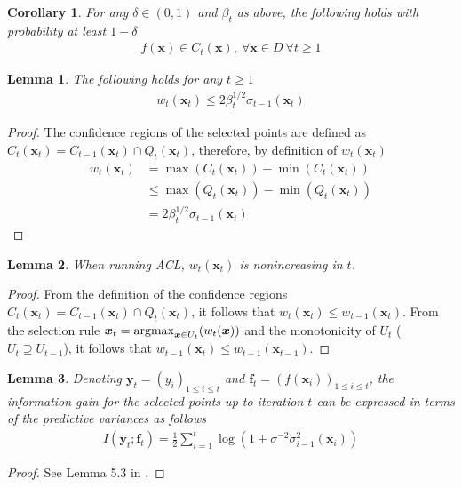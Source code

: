 \documentclass{article}
\def\*#1{\bm{#1}}
\newcommand{\argmax}{\operatornamewithlimits{argmax}}
\newtheorem{lemma}{Lemma}
\newtheorem{cor}{Corollary}
\newcommand{\acl}{\textsf{ACL}\xspace}
\begin{document}
\begin{cor}
\label{cor:cs}
For any $\delta \in (0, 1)$ and $\beta_t$ as above, the following holds
with probability at least $1-\delta$
\begin{align*}
f(\*x) \in C_t(\*x),\ \forall \*x \in D\ \forall t \geq 1
\end{align*}
\end{cor}

\begin{lemma}
\label{lem:wb}
The following holds for any $t \geq 1$
\begin{align*}
w_t(\*x_t) \leq 2\beta_t^{1/2}\sigma_{t-1}(\*x_t)
\end{align*}
\end{lemma}
\begin{proof}
The confidence regions of the selected points are defined as
$C_t(\*x_t) = C_{t-1}(\*x_t) \cap Q_t(\*x_t)$, therefore, by
definition of $w_t(\*x_t)$
\begin{align*}
w_t(\*x_t) &= \max(C_t(\*x_t)) - \min(C_t(\*x_t))\\
&\leq \max(Q_t(\*x_t)) - \min(Q_t(\*x_t))\\
&=2\beta_t^{1/2}\sigma_{t-1}(\*x_t)
\end{align*}
\end{proof}

\begin{lemma}
\label{lem:dec}
When running \acl, $w_t(\*x_t)$ is nonincreasing in $t$.
\end{lemma}
\begin{proof}
From the definition of the confidence regions
$C_t(\*x_t) = C_{t-1}(\*x_t) \cap Q_t(\*x_t)$, it follows that
$w_t(\*x_t) \leq w_{t-1}(\*x_t)$. From the selection rule
$\*x_t = \argmax_{\*x\in U_t}(w_t(\*x))$ and the monotonicity of
$U_t$ ($U_t \supseteq U_{t-1}$), it follows that
$w_{t-1}(\*x_t) \leq w_{t-1}(\*x_{t-1})$.
\end{proof}

\begin{lemma}
\label{lem:ig}
Denoting $\*y_t = (y_i)_{1\leq i\leq t}$ and
$\*f_t = (f(\*x_i))_{1\leq i\leq t}$,
the information gain for the selected points up to iteration $t$ can be
expressed in terms of the predictive variances as follows
\begin{align*}
I(\*y_t; \*f_t) = \frac{1}{2}\sum_{i=1}^t \log(1 + \sigma^{-2}\sigma_{i-1}^2(\*x_i))
\end{align*}
\end{lemma}
\begin{proof}
See Lemma 5.3 in \cite{srinivas2010}.
\end{proof}
\end{document}

